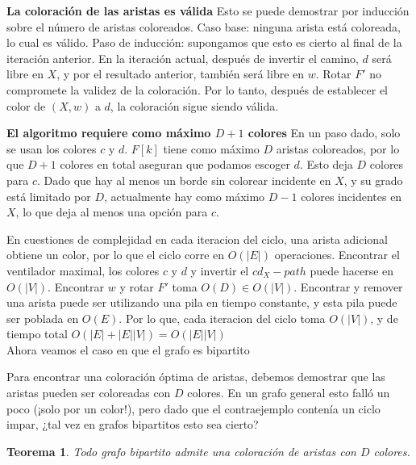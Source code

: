 \documentclass[a4paper]{article}
\newtheorem{theorem}{Teorema}
\begin{document}
\textbf{La coloración de las aristas es válida}
Esto se puede demostrar por inducción sobre el número de aristas coloreados. Caso base: ninguna arista está coloreada, lo cual es válido. Paso de inducción: supongamos que esto es cierto al final de la iteración anterior. En la iteración actual, después de invertir el camino, \( d \) será libre en \( X \), y por el resultado anterior, también será libre en \( w \). Rotar \( F' \) no compromete la validez de la coloración. Por lo tanto, después de establecer el color de \( (X, w) \) a \( d \), la coloración sigue siendo válida.

\textbf{El algoritmo requiere como máximo \( D + 1 \) colores}
En un paso dado, solo se usan los colores \( c \) y \( d \). \( F[k] \) tiene como máximo \( D \) aristas coloreados, por lo que \( D + 1 \) colores en total aseguran que podamos escoger \( d \). Esto deja \( D \) colores para \( c \). Dado que hay al menos un borde sin colorear incidente en \( X \), y su grado está limitado por \( D \), actualmente hay como máximo \( D - 1 \) colores incidentes en \( X \), lo que deja al menos una opción para \( c \).

En cuestiones de complejidad en cada iteracion del ciclo, una arista adicional obtiene un color, por lo que el ciclo corre en
$O(|E|)$ operaciones. Encontrar el ventilador maximal, los colores $c$ y $d$ y invertir el $cd_X-path$ puede hacerse en $ O(|V|)$. Encontrar $w$ y rotar $F'$ toma $O(D) \in O(|V|)$. Encontrar y remover una arista puede ser utilizando una pila en tiempo constante, y esta pila puede ser poblada en $O(E)$. Por lo que, cada iteracion del ciclo toma $O(|V|)$, y de tiempo total
$O(|E|+|E||V|)=O(|E||V|)$\\


Ahora veamos el caso en que el grafo es bipartito

Para encontrar una coloración óptima de aristas, debemos demostrar que las aristas pueden ser coloreadas con $D$ colores. En un grafo general esto falló un poco (¡solo por un color!), pero dado que el contraejemplo contenía un ciclo impar, ¿tal vez en grafos bipartitos esto sea cierto?

\begin{theorem}
Todo grafo bipartito admite una coloración de aristas con $D$ colores.
\end{theorem}
\end{document}
